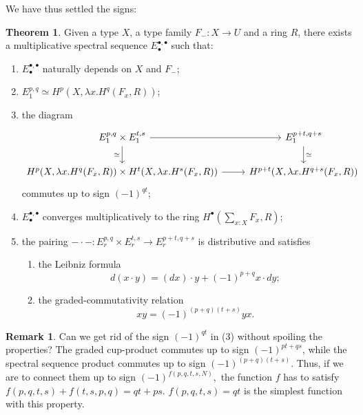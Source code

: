 \documentclass{amsart}
\theoremstyle{definition}
\newtheorem{thm}[theorem]{Theorem}
\newtheorem{re}[theorem]{Remark}
\newcommand{\tot}[2]{\sum\limits_{#1}^{}{#2}}
\begin{document}
We have thus settled the signs:
\begin{thm}\label{th:main-result}
    Given a type $X$, a type family $F_{-}: X \to U$ and a ring $R$, there exists a multiplicative spectral sequence $E_\bullet^{\bullet,\bullet}$ such that:
    \begin{enumerate}
        \item $E_\bullet^{\bullet,\bullet}$ naturally depends on $X$ and $F_{-}$;
        \item $E_1^{p,q} \simeq H^{p}(X, \lambda x.H^{q}(F_x, R))$;
        \item the diagram
        \[\begin{tikzcd}
        	{E_1^{p,q} \times E_1^{t,s} } & {E_1^{p+t,q+s}} \\
        	{H^{p}(X, \lambda x.H^{q}(F_x, R)) \times H^{t}(X, \lambda x.H^{s}(F_x, R))} & {H^{p+t}(X, \lambda x.H^{q+s}(F_x, R))}
        	\arrow[from=1-1, to=1-2]
        	\arrow["\simeq"', from=1-1, to=2-1]
        	\arrow["\simeq", from=1-2, to=2-2]
        	\arrow[from=2-1, to=2-2]
        \end{tikzcd}\]
        commutes up to sign $(-1)^{qt}$;
        \item $E_\bullet^{\bullet,\bullet}$ converges multiplicatively to the ring $H^{\bullet}(\tot{x:X}{F_x}, R)$;
        \item the pairing $-\cdot-: E_r^{p,q} \times E_r^{t,s} \to E_r^{p+t,q+s}$ is distributive and satisfies
        \begin{enumerate}
            \item
            the Leibniz formula
            $$d(x \cdot y) = (dx)\cdot y + (-1)^{p+q}x \cdot dy;$$
            \item
            the graded-commutativity relation
            $$xy = (-1)^{(p+q)(t+s)}yx.$$
            \end{enumerate}

    \end{enumerate}
\end{thm}
\begin{re}
    Can we get rid of the sign $(-1)^{qt}$ in (3) without spoiling the properties?
    The graded cup-product commutes up to sign $(-1)^{pt+qs}$, while the spectral sequence product commutes up to sign $(-1)^{(p+q)(t+s)}$. Thus, if we are to connect them up to sign $(-1)^{f(p,q,t,s,N)},$ the function $f$ has to satisfy $f(p,q,t,s) + f(t,s,p,q) = qt+ps$. $f(p,q,t,s) =  qt$ is the simplest function with this property.
\end{re}
\end{document}
